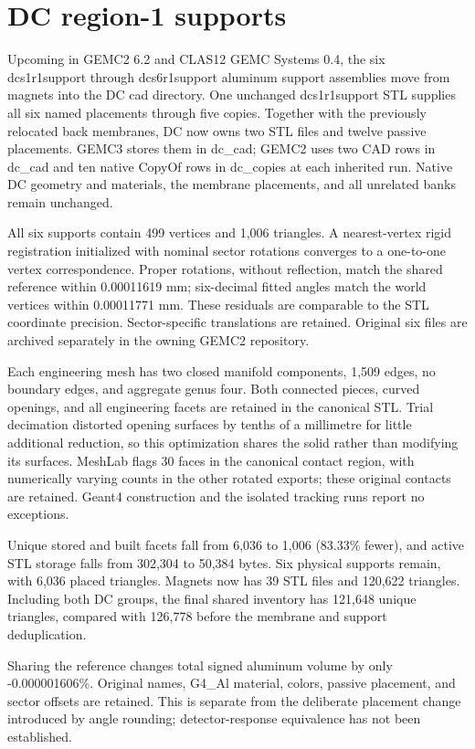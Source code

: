 \FloatBarrier
\section{DC region-1 supports}
\label{sec:dc-support}

Upcoming in GEMC2 6.2 and CLAS12 GEMC Systems 0.4, the six dcs1r1support through dcs6r1support aluminum
support assemblies move from magnets into the DC cad directory. One unchanged dcs1r1support STL supplies all
six named placements through five copies. Together with the previously relocated back membranes, DC now owns
two STL files and twelve passive placements. GEMC3 stores them in dc\_cad; GEMC2 uses two CAD rows in dc\_cad
and ten native CopyOf rows in dc\_copies at each inherited run. Native DC geometry and materials, the membrane
placements, and all unrelated banks remain unchanged.

All six supports contain 499 vertices and 1,006 triangles. A nearest-vertex rigid registration initialized
with nominal sector rotations converges to a one-to-one vertex correspondence. Proper rotations, without
reflection, match the shared reference within 0.00011619 mm; six-decimal fitted angles match the world
vertices within 0.00011771 mm. These residuals are comparable to the STL coordinate precision. Sector-specific
translations are retained. Original six files are archived separately in the owning GEMC2 repository.

Each engineering mesh has two closed manifold components, 1,509 edges, no boundary edges, and aggregate genus
four. Both connected pieces, curved openings, and all engineering facets are retained in the canonical STL.
Trial decimation distorted opening surfaces by tenths of a millimetre for little additional reduction, so this
optimization shares the solid rather than modifying its surfaces. MeshLab flags 30 faces in the canonical
contact region, with numerically varying counts in the other rotated exports; these original contacts are
retained. Geant4 construction and the isolated tracking runs report no exceptions.

Unique stored and built facets fall from 6,036 to 1,006 (83.33\% fewer), and active STL storage falls from
302,304 to 50,384 bytes. Six physical supports remain, with 6,036 placed triangles. Magnets now has 39 STL
files and 120,622 triangles. Including both DC groups, the final shared inventory has 121,648 unique
triangles, compared with 126,778 before the membrane and support deduplication.

Sharing the reference changes total signed aluminum volume by only -0.000001606\%. Original names, G4\_Al
material, colors, passive placement, and sector offsets are retained. This is separate from the deliberate
placement change introduced by angle rounding; detector-response equivalence has not been established.

